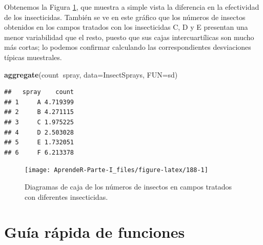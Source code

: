 \documentclass[]{book}
\newenvironment{Shaded}{\begin{snugshade}}{\end{snugshade}}
\newcommand{\DataTypeTok}[1]{\textcolor[rgb]{0.13,0.29,0.53}{#1}}
\newcommand{\KeywordTok}[1]{\textcolor[rgb]{0.13,0.29,0.53}{\textbf{#1}}}
\newcommand{\NormalTok}[1]{#1}
\newcommand{\OperatorTok}[1]{\textcolor[rgb]{0.81,0.36,0.00}{\textbf{#1}}}
\theoremstyle{definition}
\theoremstyle{definition}
\theoremstyle{definition}
\theoremstyle{remark}
\begin{document}
Obtenemos la Figura \ref{fig:188}, que muestra a simple vista la diferencia en la efectividad de los insecticidas. También se ve en este gráfico que los números de insectos obtenidos en los campos tratados con los insecticidas C, D y E presentan una menor variabilidad que el resto, puesto que sus cajas intercuartílicas son mucho más cortas; lo podemos confirmar calculando las correspondientes desviaciones típicas muestrales.

\begin{Shaded}
\begin{Highlighting}[]
\KeywordTok{aggregate}\NormalTok{(count}\OperatorTok{~}\NormalTok{spray, }\DataTypeTok{data=}\NormalTok{InsectSprays, }\DataTypeTok{FUN=}\NormalTok{sd)}
\end{Highlighting}
\end{Shaded}

\begin{verbatim}
##   spray    count
## 1     A 4.719399
## 2     B 4.271115
## 3     C 1.975225
## 4     D 2.503028
## 5     E 1.732051
## 6     F 6.213378
\end{verbatim}

\begin{figure}

{\centering \texttt{[image: AprendeR-Parte-I\_files/figure-latex/188-1]} 

}

\caption{Diagramas de caja de los números de insectos en campos tratados con diferentes insecticidas.}\label{fig:188}
\end{figure}

\hypertarget{guia-rapida-de-funciones-6}{%
\section{Guía rápida de funciones}\label{guia-rapida-de-funciones-6}}
\end{document}
